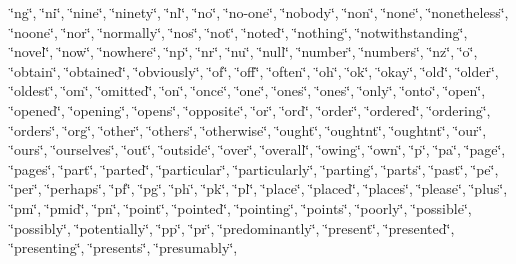 \char`\"{}ng\char`\"{}, \char`\"{}ni\char`\"{}, \char`\"{}nine\char`\"{}, \char`\"{}ninety\char`\"{}, \char`\"{}nl\char`\"{}, \char`\"{}no\char`\"{}, \char`\"{}no-\/one\char`\"{}, \char`\"{}nobody\char`\"{}, \char`\"{}non\char`\"{}, \char`\"{}none\char`\"{}, \char`\"{}nonetheless\char`\"{}, \char`\"{}noone\char`\"{}, \char`\"{}nor\char`\"{}, \char`\"{}normally\char`\"{}, \char`\"{}nos\char`\"{}, \char`\"{}not\char`\"{}, \char`\"{}noted\char`\"{}, \char`\"{}nothing\char`\"{}, \char`\"{}notwithstanding\char`\"{}, \char`\"{}novel\char`\"{}, \char`\"{}now\char`\"{}, \char`\"{}nowhere\char`\"{}, \char`\"{}np\char`\"{}, \char`\"{}nr\char`\"{}, \char`\"{}nu\char`\"{}, \char`\"{}null\char`\"{}, \char`\"{}number\char`\"{}, \char`\"{}numbers\char`\"{}, \char`\"{}nz\char`\"{}, \char`\"{}o\char`\"{}, \char`\"{}obtain\char`\"{}, \char`\"{}obtained\char`\"{}, \char`\"{}obviously\char`\"{}, \char`\"{}of\char`\"{}, \char`\"{}off\char`\"{}, \char`\"{}often\char`\"{}, \char`\"{}oh\char`\"{}, \char`\"{}ok\char`\"{}, \char`\"{}okay\char`\"{}, \char`\"{}old\char`\"{}, \char`\"{}older\char`\"{}, \char`\"{}oldest\char`\"{}, \char`\"{}om\char`\"{}, \char`\"{}omitted\char`\"{}, \char`\"{}on\char`\"{}, \char`\"{}once\char`\"{}, \char`\"{}one\char`\"{}, \char`\"{}one\textquotesingle{}s\char`\"{}, \char`\"{}ones\char`\"{}, \char`\"{}only\char`\"{}, \char`\"{}onto\char`\"{}, \char`\"{}open\char`\"{}, \char`\"{}opened\char`\"{}, \char`\"{}opening\char`\"{}, \char`\"{}opens\char`\"{}, \char`\"{}opposite\char`\"{}, \char`\"{}or\char`\"{}, \char`\"{}ord\char`\"{}, \char`\"{}order\char`\"{}, \char`\"{}ordered\char`\"{}, \char`\"{}ordering\char`\"{}, \char`\"{}orders\char`\"{}, \char`\"{}org\char`\"{}, \char`\"{}other\char`\"{}, \char`\"{}others\char`\"{}, \char`\"{}otherwise\char`\"{}, \char`\"{}ought\char`\"{}, \char`\"{}oughtn\textquotesingle{}t\char`\"{}, \char`\"{}oughtnt\char`\"{}, \char`\"{}our\char`\"{}, \char`\"{}ours\char`\"{}, \char`\"{}ourselves\char`\"{}, \char`\"{}out\char`\"{}, \char`\"{}outside\char`\"{}, \char`\"{}over\char`\"{}, \char`\"{}overall\char`\"{}, \char`\"{}owing\char`\"{}, \char`\"{}own\char`\"{}, \char`\"{}p\char`\"{}, \char`\"{}pa\char`\"{}, \char`\"{}page\char`\"{}, \char`\"{}pages\char`\"{}, \char`\"{}part\char`\"{}, \char`\"{}parted\char`\"{}, \char`\"{}particular\char`\"{}, \char`\"{}particularly\char`\"{}, \char`\"{}parting\char`\"{}, \char`\"{}parts\char`\"{}, \char`\"{}past\char`\"{}, \char`\"{}pe\char`\"{}, \char`\"{}per\char`\"{}, \char`\"{}perhaps\char`\"{}, \char`\"{}pf\char`\"{}, \char`\"{}pg\char`\"{}, \char`\"{}ph\char`\"{}, \char`\"{}pk\char`\"{}, \char`\"{}pl\char`\"{}, \char`\"{}place\char`\"{}, \char`\"{}placed\char`\"{}, \char`\"{}places\char`\"{}, \char`\"{}please\char`\"{}, \char`\"{}plus\char`\"{}, \char`\"{}pm\char`\"{}, \char`\"{}pmid\char`\"{}, \char`\"{}pn\char`\"{}, \char`\"{}point\char`\"{}, \char`\"{}pointed\char`\"{}, \char`\"{}pointing\char`\"{}, \char`\"{}points\char`\"{}, \char`\"{}poorly\char`\"{}, \char`\"{}possible\char`\"{}, \char`\"{}possibly\char`\"{}, \char`\"{}potentially\char`\"{}, \char`\"{}pp\char`\"{}, \char`\"{}pr\char`\"{}, \char`\"{}predominantly\char`\"{}, \char`\"{}present\char`\"{}, \char`\"{}presented\char`\"{}, \char`\"{}presenting\char`\"{}, \char`\"{}presents\char`\"{}, \char`\"{}presumably\char`\"{}, 